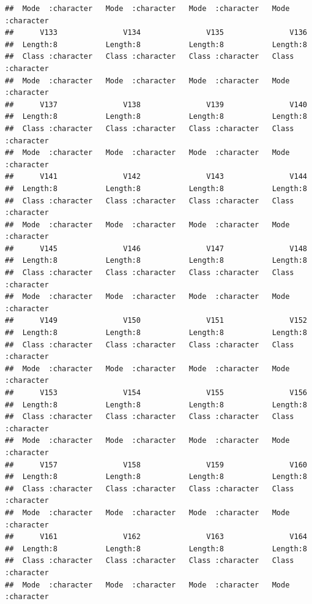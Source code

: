 \documentclass[
]{article}
\begin{document}
\begin{verbatim}
##  Mode  :character   Mode  :character   Mode  :character   Mode  :character  
##      V133               V134               V135               V136          
##  Length:8           Length:8           Length:8           Length:8          
##  Class :character   Class :character   Class :character   Class :character  
##  Mode  :character   Mode  :character   Mode  :character   Mode  :character  
##      V137               V138               V139               V140          
##  Length:8           Length:8           Length:8           Length:8          
##  Class :character   Class :character   Class :character   Class :character  
##  Mode  :character   Mode  :character   Mode  :character   Mode  :character  
##      V141               V142               V143               V144          
##  Length:8           Length:8           Length:8           Length:8          
##  Class :character   Class :character   Class :character   Class :character  
##  Mode  :character   Mode  :character   Mode  :character   Mode  :character  
##      V145               V146               V147               V148          
##  Length:8           Length:8           Length:8           Length:8          
##  Class :character   Class :character   Class :character   Class :character  
##  Mode  :character   Mode  :character   Mode  :character   Mode  :character  
##      V149               V150               V151               V152          
##  Length:8           Length:8           Length:8           Length:8          
##  Class :character   Class :character   Class :character   Class :character  
##  Mode  :character   Mode  :character   Mode  :character   Mode  :character  
##      V153               V154               V155               V156          
##  Length:8           Length:8           Length:8           Length:8          
##  Class :character   Class :character   Class :character   Class :character  
##  Mode  :character   Mode  :character   Mode  :character   Mode  :character  
##      V157               V158               V159               V160          
##  Length:8           Length:8           Length:8           Length:8          
##  Class :character   Class :character   Class :character   Class :character  
##  Mode  :character   Mode  :character   Mode  :character   Mode  :character  
##      V161               V162               V163               V164          
##  Length:8           Length:8           Length:8           Length:8          
##  Class :character   Class :character   Class :character   Class :character  
##  Mode  :character   Mode  :character   Mode  :character   Mode  :character  

\end{verbatim}
\end{document}
